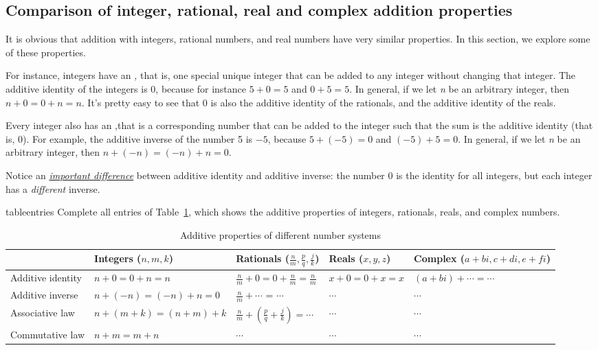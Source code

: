 \subsection{Comparison of integer, rational, real and complex addition properties}

It is obvious that addition with integers, rational numbers, and
real numbers have very similar properties. In this section, we explore some of these properties.

For instance, integers have an \emph{,
}that is, one special unique integer that can be added to any integer
without changing that integer. The additive identity of the integers
is 0, because for instance $5+0=5$ and $0+5=5$. In general, if we
let \emph{n }be an arbitrary integer, then $n+0=0+n=n$. It's pretty
easy to see that 0 is also the additive identity of the rationals,
and the additive identity of the reals.

Every integer also has an ,that is a corresponding number that can be added to the integer such
that the sum is the additive identity (that is, 0). For example, the
additive inverse of the number 5 is $-5$, because $5+(-5)=0$ and
$(-5)+5=0$. In general, if we let \emph{n }be an arbitrary integer,
then $n+(-n)=(-n)+n=0$.

Notice an \underline{\emph{important difference}}  between additive
identity and additive inverse: the number 0 is the identity for all
integers, but each integer has a \emph{different} inverse.

\begin{exercise}{tableentries}
Complete all entries of Table~\ref{additive_table}, which shows the additive properties of integers,
rationals, reals, and complex numbers.
\begin{table}[!htb]
\caption{Additive properties of different number systems}\label{additive_table}
\begin{tabular}{|p{1.8cm}|p{2.1cm}|p{2.3cm}|p{1.9cm}|p{2.8cm}|}
\hline 
\rule{0pt}{2.6ex} &Integers ($n,m,k$)  & Rationals ($\frac{n}{m},\frac{p}{q},\frac{j}{k}$)  & Reals ($x,y,z$)  & Complex  ($a+bi,c+di,e+fi$) \rule[-1.2ex]{0pt}{0pt} \tabularnewline
\hline
\hline 
\rule{0pt}{2.6ex} Additive  identity  &  $n+0 = 0+n  =n$   & $\frac{n}{m}+0 = 0+\frac{n}{m}=\frac{n}{m}$  & $x+0= 0+x=x$  &  $(a+bi)+\cdots= \cdots$ \rule[-1.2ex]{0pt}{0pt} \tabularnewline
\hline 
\rule{0pt}{2.6ex} Additive inverse  & $n+(-n)=(-n)+n=0$  & $\frac{n}{m} +  \cdots$ = $\cdots$  & $\cdots$  & $\cdots$ \rule[-1.2ex]{0pt}{0pt} \tabularnewline
\hline 
\rule{0pt}{2.6ex} Associative law\index{Associative property}  & $n+(m+k)=(n+m)+k$  & $\frac{n}{m}+(\frac{p}{q}+\frac{j}{k}) = \cdots$  & $\cdots$  & $\cdots$ \rule[-1.2ex]{0pt}{0pt} \tabularnewline
\hline 
\rule{0pt}{2.6ex} Commutative law\index{Commutative property}  & $n+m=m+n$  & $\cdots$  & $\cdots$ & $\cdots$\rule[-1.2ex]{0pt}{0pt} \tabularnewline
\hline
\end{tabular}
\end{table}

\end{exercise}

